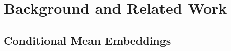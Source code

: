 \documentclass[twoside]{article}
\begin{document}
	
	\section{Background and Related Work}
	\label{sec:background}
	
		\subsection{Conditional Mean Embeddings}
		
			
\end{document}
